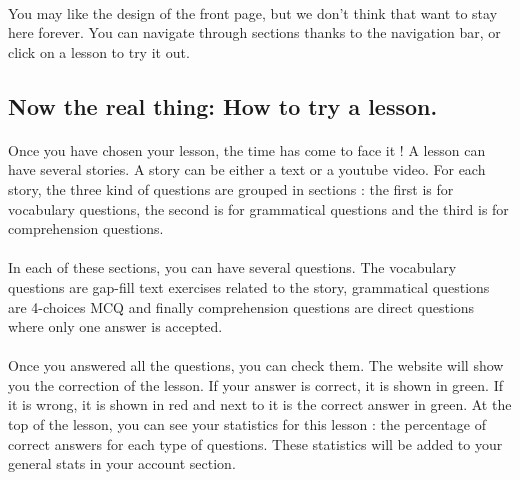 \paragraph{}
You may like the design of the front page, but we don't think that want to stay here forever. You can navigate through sections thanks to the navigation bar, or click on a lesson to try it out.

\subsection{Now the real thing: How to try a lesson.}

\paragraph{}
Once you have chosen your lesson, the time has come to face it ! A lesson can have several stories. A story can be either a text or a youtube video. For each story, the three kind of questions are grouped in sections : the first is for vocabulary questions, the second is for grammatical questions and the third is for comprehension questions.

\paragraph{}
In each of these sections, you can have several questions. The vocabulary questions are gap-fill text exercises related to the story, grammatical questions are 4-choices MCQ and finally comprehension questions are direct questions where only one answer is accepted.

\paragraph{}
Once you answered all the questions, you can check them. The website will show you the correction of the lesson. If your answer is correct, it is shown in green. If it is wrong, it is shown in red and next to it is the correct answer in green. \linebreak
At the top of the lesson, you can see your statistics for this lesson : the percentage of correct answers for each type of questions. These statistics will be added to your general stats in your account section.

